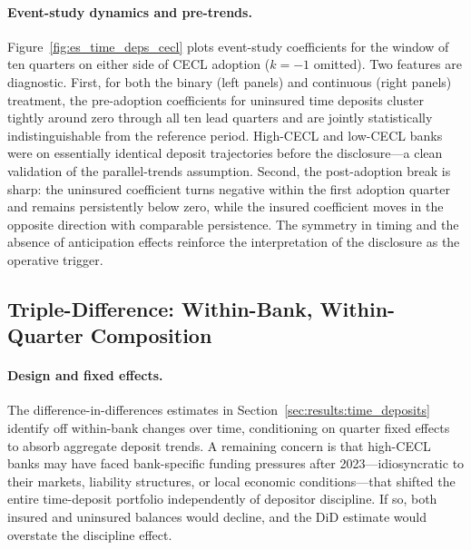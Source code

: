 \paragraph{Event-study dynamics and pre-trends.}
Figure~\ref{fig:es_time_deps_cecl} plots event-study coefficients for the window
of ten quarters on either side of CECL adoption ($k = -1$ omitted).  Two features
are diagnostic.  First, for both the binary (left panels) and continuous (right
panels) treatment, the pre-adoption coefficients for uninsured time deposits
cluster tightly around zero through all ten lead quarters and are jointly
statistically indistinguishable from the reference period.  High-CECL and low-CECL
banks were on essentially identical deposit trajectories before the
disclosure---a clean validation of the parallel-trends assumption.  Second, the
post-adoption break is sharp: the uninsured coefficient turns negative within the
first adoption quarter and remains persistently below zero, while the insured
coefficient moves in the opposite direction with comparable persistence.  The
symmetry in timing and the absence of anticipation effects reinforce the
interpretation of the disclosure as the operative trigger.

\subsection{Triple-Difference: Within-Bank, Within-Quarter Composition}
\label{sec:results:triple}

\paragraph{Design and fixed effects.}
The difference-in-differences estimates in Section~\ref{sec:results:time_deposits}
identify off within-bank changes over time, conditioning on quarter fixed effects
to absorb aggregate deposit trends.  A remaining concern is that high-CECL banks
may have faced bank-specific funding pressures after 2023---idiosyncratic to their
markets, liability structures, or local economic conditions---that shifted the
entire time-deposit portfolio independently of depositor discipline.  If so, both
insured and uninsured balances would decline, and the DiD estimate would
overstate the discipline effect.

